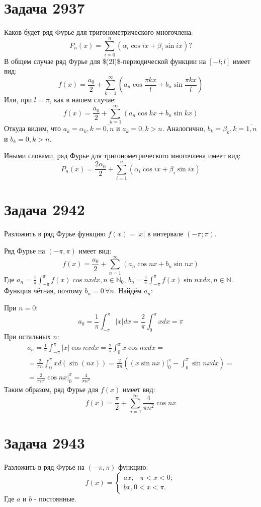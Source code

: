 \documentclass[11pt]{article}
\begin{document}
\section{Задача 2937}
\label{sec:org06b77b3}
Каков будет ряд Фурье для тригонометрического многочлена:
$$P_n(x) = \sum_{i = 0}^n(\alpha_i\cos ix + \beta_i\sin ix)?$$
В общем случае ряд Фурье для \$(2l)\$-периодической функции на \([-l; l]\) имеет вид:
$$f(x) = \frac{a_0}{2} + \sum_{k = 1}^{\infty}(a_n\cos\frac{\pi k x}{l} + b_n\sin\frac{\pi k x}{l})$$
Или, при \(l = \pi\), как в нашем случае:
$$f(x) = \frac{a_0}{2} + \sum_{k = 1}^{\infty}(a_n\cos kx + b_n\sin kx)$$
Откуда видим, что \(a_k = \alpha_k, k = \overline{0, n}\) и \(a_k = 0, k > n\). Аналогично, \(b_k = \beta_k,
k = \overline{1, n}\) и \(b_k = 0, k > n\).

Иными словами, ряд Фурье для тригонометрического многочлена имеет вид:
$$P_n(x) = \frac{2\alpha_0}{2} + \sum_{i=1}^n(\alpha_i\cos ix + \beta_i\sin ix)$$
\section{Задача 2942}
\label{sec:orgf5342d1}
Разложить в ряд Фурье функцию \(f(x) = |x|\) в интервале \((-\pi; \pi)\).

Ряд Фурье на \((-\pi, \pi)\) имеет вид:
$$f(x) = \frac{a_0}{2} + \sum_{n = 1}^{\infty}(a_n\cos nx + b_n\sin nx)$$
Где \(a_n = \frac{1}\pi\int_{-\pi}^\pi f(x)\cos nxdx, n \in \mathbb{N}_0\),
\(b_n = \frac{1}\pi\int_{-\pi}^\pi f(x)\sin nxdx, n \in \mathbb{N}\).
Функция чётная, поэтому \(b_n = 0\, \forall n\). Найдём \(a_n\):

При \(n = 0\):
$$a_0 = \frac{1}\pi\int_{-\pi}^\pi |x|dx = \frac{2}\pi\int_0^\pi xdx = \pi$$
При остальных \(n\):
\begin{multline*}
a_n = \frac{1}\pi\int_{-\pi}^\pi |x|\cos nx dx = \frac{2}\pi\int_0^\pi x\cos nx dx = \\
 = \frac{2}{\pi n}\int_0^\pi xd(\sin(nx)) = \frac{2}{\pi n}\left((x\sin nx)\bigg|_0^\pi - \int_0^\pi\sin nxdx\right) = \\
 = \frac{2}{\pi n^2}\cos nx\bigg|_0^\pi = \frac{4}{\pi n^2}
\end{multline*}
Таким образом, ряд Фурье для \(f(x)\) имеет вид:
$$f(x) = \frac{\pi}{2} + \sum_{n = 1}^\infty\frac{4}{\pi n^2}\cos nx$$
\section{Задача 2943}
\label{sec:orgca178c9}
Разложить в ряд Фурье на \((-\pi, \pi)\) функцию:
\begin{equation*}
f(x) = \begin{cases}
ax, -\pi < x < 0;\\
bx, 0 < x < \pi.
\end{cases}
\end{equation*}
Где \(a\) и \(b\) - постоянные.
\end{document}
